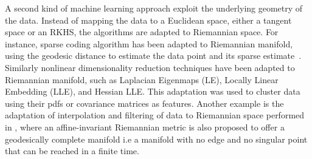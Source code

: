 {%
A second kind of machine learning approach exploit the underlying geometry of the data.
Instead of mapping the data to a Euclidean space, either a tangent space or an RKHS, the algorithms are adapted to Riemannian space. 
For instance, sparse coding algorithm has been adapted to Riemannian manifold, using the geodesic distance to estimate the data point and its sparse estimate~\citep{xie2013nonlinear}.
Similarly nonlinear dimensionality reduction techniques have been adapted to Riemannian manifold, such as Laplacian Eigenmaps (LE), Locally Linear Embedding (LLE), and Hessian LLE. 
This adaptation was used to cluster data using their pdfs \citep{goh2008unsupervised} or covariance matrices \citep{goh2008clustering} as features. 
Another example is the adaptation of interpolation and filtering of data to Riemannian space performed in \citep{PEN06}, where an affine-invariant Riemannian metric is also proposed to offer a geodesically complete manifold i.e a manifold with no edge and no singular point that can be reached in a finite time.  

}
